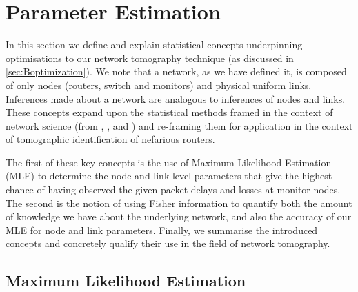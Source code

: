 \section{Parameter Estimation}
\label{sec:Bparameterestimation}

In this section we define and explain statistical concepts underpinning optimisations to our network tomography technique (as discussed in \cref{sec:Boptimization}). We note that a network, as we have defined it, is composed of only nodes (routers, switch and monitors) and physical uniform links. Inferences made about a network are analogous to inferences of nodes and links. These concepts expand upon the statistical methods framed in the context of network science (from \cite{meng_method_2016}, \cite{he_fisher_2015}, and \cite{he_network_2021}) and re-framing them for application in the context of tomographic identification of nefarious routers.\par
The first of these key concepts is the use of Maximum Likelihood Estimation (MLE) to determine the node and link level parameters that give the highest chance of having observed the given packet delays and losses at monitor nodes. The second is the notion of using Fisher information to quantify both the amount of knowledge we have about the underlying network, and also the accuracy of our MLE for node and link parameters. Finally, we summarise the introduced concepts and concretely qualify their use in the field of network tomography.

\subsection{Maximum Likelihood Estimation}
\label{ssec:Bmle}

